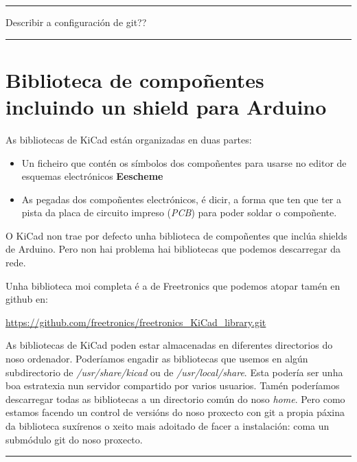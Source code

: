 \begin{center}\rule{0.5\linewidth}{\linethickness}\end{center}

Describir a configuración de git??

\begin{center}\rule{0.5\linewidth}{\linethickness}\end{center}

\section{Biblioteca de compoñentes incluindo un shield para
Arduino}\label{biblioteca-de-compouxf1entes-incluindo-un-shield-para-arduino}

As bibliotecas de KiCad están organizadas en duas partes:

\begin{itemize}
\item
  Un ficheiro que contén os símbolos dos compoñentes para usarse no
  editor de esquemas electrónicos \textbf{Eescheme}
\item
  As pegadas dos compoñentes electrónicos, é dicir, a forma que ten que
  ter a pista da placa de circuito impreso (\emph{PCB}) para poder
  soldar o compoñente.
\end{itemize}

O KiCad non trae por defecto unha biblioteca de compoñentes que inclúa
shields de Arduino. Pero non hai problema hai bibliotecas que podemos
descarregar da rede.

Unha biblioteca moi completa é a de Freetronics que podemos atopar tamén
en github en:

\url{https://github.com/freetronics/freetronics_KiCad_library.git}

As bibliotecas de KiCad poden estar almacenadas en diferentes
directorios do noso ordenador. Poderíamos engadir as bibliotecas que
usemos en algún subdirectorio de \emph{/usr/share/kicad} ou de
\emph{/usr/local/share}. Esta podería ser unha boa estratexia nun
servidor compartido por varios usuarios. Tamén poderíamos descarregar
todas as bibliotecas a un directorio común do noso \emph{home}. Pero
como estamos facendo un control de versións do noso proxecto con git a
propia páxina da biblioteca suxírenos o xeito mais adoitado de facer a
instalación: coma un submódulo git do noso proxecto.

\begin{center}\rule{0.5\linewidth}{\linethickness}\end{center}

